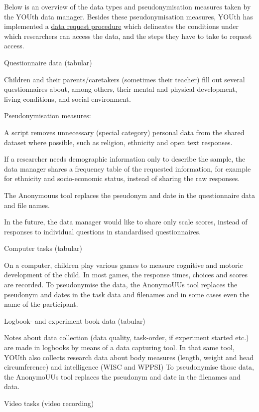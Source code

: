 \documentclass[
]{book}
\begin{document}
Below is an overview of the data types and pseudonymisation measures taken by
the YOUth data manager. Besides these pseudonymisation measures, YOUth has
implemented a
\href{https://www.uu.nl/en/research/youth-cohort-study/data-access}{data request procedure}
which delineates the conditions under which researchers can access the data,
and the steps they have to take to request access.

Questionnaire data (tabular)

Children and their parents/caretakers (sometimes their teacher) fill out
several questionnaires about, among others, their mental and physical
development, living conditions, and social environment.

Pseudonymisation measures:

A script removes unnecessary (special category) personal data from the
shared dataset where possible, such as religion, ethnicity and open text
responses.

If a researcher needs demographic information only to describe the sample,
the data manager shares a frequency table of the requested information, for
example for ethnicity and socio-economic status, instead of sharing the raw
responses.

The Anonymouus tool replaces the pseudonym and date in the questionnaire
data and file names.

In the future, the data manager would like to share only scale scores, instead of responses to individual questions in standardised questionnaires.

Computer tasks (tabular)

On a computer, children play various games to measure cognitive and motoric
development of the child. In most games, the response times, choices and scores
are recorded. To pseudonymise the data, the AnonymoUUs tool replaces the
pseudonym and dates in the task data and filenames and in some cases even the
name of the participant.

Logbook- and experiment book data (tabular)

Notes about data collection (data quality, task-order, if experiment
started etc.) are made in logbooks by means of a data capturing tool. In that
same tool, YOUth also collects research data about body measures (length, weight
and head circumference) and intelligence (WISC and WPPSI) To pseudonymise those
data, the AnonymoUUs tool replaces the pseudonym and date in the filenames and
data.

Video tasks (video recording)
\end{document}
